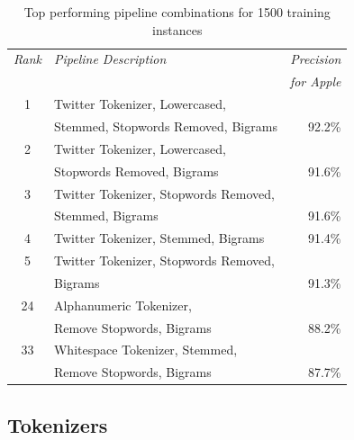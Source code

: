 \documentclass[letterpaper]{article}
\begin{document}
\begin{table}[ht]
\centering
\small
\begin{tabular}{|c|l|r|}
	\hline
	\textit{Rank} & \textit{Pipeline Description} & \textit{Precision} \\
	& & \textit{for Apple} \\ \hline
	1 & Twitter Tokenizer, Lowercased, & \\ & Stemmed, Stopwords Removed, Bigrams & 92.2\% \\ \hline
	2 & Twitter Tokenizer, Lowercased, & \\ & Stopwords Removed, Bigrams & 91.6\% \\ \hline
	3 & Twitter Tokenizer, Stopwords Removed, & \\ & Stemmed, Bigrams & 91.6\% \\ \hline
	4 & Twitter Tokenizer, Stemmed, Bigrams & 91.4\% \\ \hline
	5 & Twitter Tokenizer, Stopwords Removed, & \\ & Bigrams & 91.3\% \\ \hline
	\hline
	24 & Alphanumeric Tokenizer, & \\ & Remove Stopwords, Bigrams & 88.2\% \\ \hline
	\hline
	33 & Whitespace Tokenizer, Stemmed, & \\ & Remove Stopwords, Bigrams & 87.7\% \\ \hline
\end{tabular}
\caption{Top performing pipeline combinations for 1500 training instances}
\label{tab:top_pipelines}
\end{table}





\subsection{Tokenizers}
\end{document}

